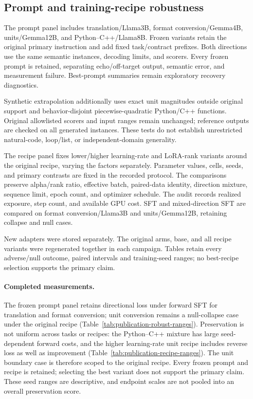 \subsection{Prompt and training-recipe robustness}
\label{app:robustness}

The prompt panel includes translation/Llama3B, format conversion/Gemma4B, units/Gemma12B,
and Python--C++/Llama8B. Frozen variants retain the original primary instruction and add fixed
task/contract prefixes. Both directions use the same semantic instances, decoding limits,
and scorers. Every frozen prompt is retained, separating echo/off-target output, semantic error,
and measurement failure. Best-prompt summaries remain exploratory recovery diagnostics.

Synthetic extrapolation additionally uses exact unit magnitudes outside original support and
behavior-disjoint piecewise-quadratic Python/C++ functions. Original allowlisted scorers and
input ranges remain unchanged; reference outputs are checked on all generated instances.
These tests do not establish unrestricted natural-code, loop/list, or independent-domain
generality.

The recipe panel fixes lower/higher learning-rate and LoRA-rank variants around the original
recipe, varying the factors separately. Parameter values, cells, seeds, and primary contrasts
are fixed in the recorded protocol. The comparisons preserve alpha/rank ratio, effective batch, paired-data
identity, direction mixture, sequence limit, epoch count, and optimizer schedule. The audit
records realized exposure, step count, and available GPU cost. SFT and mixed-direction SFT are compared on
format conversion/Llama3B and units/Gemma12B, retaining collapse and null cases.

New adapters were stored separately. The original arms, base, and all recipe variants were
regenerated together in each campaign. Tables retain every adverse/null outcome, paired intervals and
training-seed ranges; no best-recipe selection supports the primary claim.
\paragraph{Completed measurements.}
The frozen prompt panel retains directional loss under forward SFT for translation and format
conversion; unit conversion remains a null-collapse case under the original recipe
(Table~\ref{tab:publication-robust-ranges}). Preservation is not uniform across tasks or
recipes: the Python--C++ mixture has large seed-dependent forward costs, and the higher
learning-rate unit recipe includes reverse loss as well as improvement
(Table~\ref{tab:publication-recipe-ranges}). The unit boundary case is therefore scoped to
the original recipe. Every frozen prompt and recipe is retained; selecting the best variant
does not support the primary claim. These seed ranges are descriptive, and endpoint scales
are not pooled into an overall preservation score.

